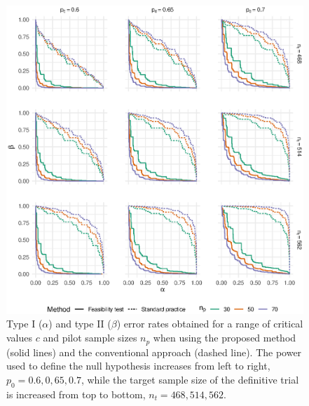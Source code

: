 \documentclass{article}
\begin{document}
\begin{figure}
\centering
\includegraphics[scale=0.8, trim={1.5cm 0 0 0},clip]{eval}
\caption{Type I ($\alpha$) and type II ($\beta$) error rates obtained for a range of critical values $c$ and pilot sample sizes $n_p$ when using the proposed method (solid lines) and the conventional approach (dashed line). The power used to define the null hypothesis increases from left to right, $p_0 = 0.6, 0,65, 0.7$, while the target sample size of the definitive trial is increased from top to bottom, $n_t = 468, 514, 562$.}
\label{fig:eval}
\end{figure}
 
\end{document}

